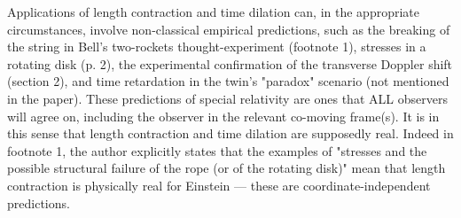 \documentclass[submitted,11pt]{article}
\begin{document}
\begin{point}
Applications of length contraction and time dilation can, in the appropriate circumstances, involve non-classical empirical predictions, such as the breaking of the string in Bell's two-rockets thought-experiment (footnote 1),  stresses in a rotating disk (p. 2), the experimental confirmation of the transverse Doppler shift (section 2), and time retardation in the twin's "paradox" scenario (not mentioned in the paper). These predictions of special relativity are ones that ALL observers will agree on, including the observer in the relevant co-moving frame(s). It is in this sense that length contraction and time dilation are
supposedly real. Indeed in footnote 1, the author explicitly states that the examples of "stresses and the possible structural failure of the rope (or of the rotating disk)" mean that length contraction is physically real for Einstein — these are coordinate-independent predictions. \label{global}
\end{point}
\end{document}

